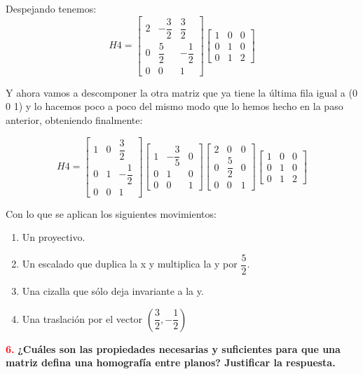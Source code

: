 \documentclass[10pt,a4paper]{article}
\begin{document}
Despejando tenemos:\\

\[H4 = 
\begin{bmatrix}
2&-\dfrac{3}{2}&\dfrac{3}{2}\\
0&\dfrac{5}{2}&-\dfrac{1}{2}\\
0&0&1
\end{bmatrix}
\begin{bmatrix}
1&0&0\\
0&1&0\\
0&1&2
\end{bmatrix}
\]

Y ahora vamos a descomponer la otra matriz que ya tiene la última fila igual a (0  0 1) y lo hacemos poco a poco del mismo modo que lo hemos hecho en la paso anterior, obteniendo finalmente:

\[H4 =
\begin{bmatrix}
1&0&\dfrac{3}{2}\\
0&1&-\dfrac{1}{2}\\
0&0&1
\end{bmatrix}
\begin{bmatrix}
1&-\dfrac{3}{5}&0\\
0&1&0\\
0&0&1
\end{bmatrix}
\begin{bmatrix}
2&0&0\\
0&\dfrac{5}{2}&0\\
0&0&1
\end{bmatrix}
\begin{bmatrix}
1&0&0\\
0&1&0\\
0&1&2
\end{bmatrix}
\]

Con lo que se aplican los siguientes movimientos:\\

\begin{enumerate}
\item Un proyectivo.
\item Un escalado que duplica la x y multiplica la y por $\dfrac{5}{2}$.
\item Una cizalla que sólo deja invariante a la y.
\item Una traslación por el vector $\left( \dfrac{3}{2},-\dfrac{1}{2} \right)$
\end{enumerate}

\textcolor{red}{\textbf{6.}} \textbf{¿Cuáles son las propiedades necesarias y suficientes para que una matriz defina una homografía entre planos? Justificar la respuesta.}\\
\end{document}
